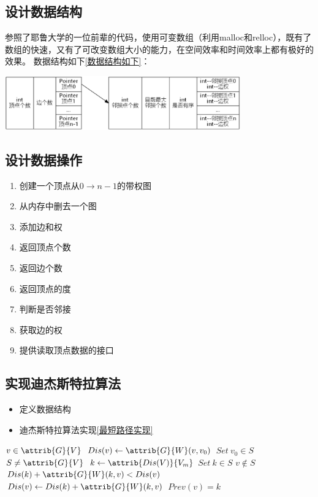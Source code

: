 \documentclass[a4paper,10pt]{ctexart}
\begin{document}
\subsection{设计数据结构}
参照了耶鲁大学的一位前辈的代码，使用可变数组（利用malloc和relloc），既有了数组的快速，又有了可改变数组大小的能力，在空间效率和时间效率上都有极好的效果。
数据结构如下\ref{数据结构如下}：


\includegraphics[width=4in]{DataStruct.eps}

\subsection{设计数据操作}
\begin{enumerate}
  \item 创建一个顶点从$0 \to n-1$的带权图
  \item 从内存中删去一个图
  \item 添加边和权
  \item 返回顶点个数
  \item 返回边个数
  \item 返回顶点的度
  \item 判断是否邻接
  \item 获取边的权
  \item 提供读取顶点数据的接口
\end{enumerate}

\subsection{实现迪杰斯特拉算法}
\begin{itemize}
  \item 定义数据结构
  \item 迪杰斯特拉算法实现\ref{最短路径实现}
\end{itemize}
\begin{codebox}
\li \For $v \in \attrib{G}{V}$                          
    \Do 
\li     $Dis(v) \gets \attrib{G}{W}(v,v_0)$             
    \End
\li $Set \  v_0 \in S$                                         
\li \While $S \ne \attrib{G}{V}$                            
    \Do
\li     $k \gets \attrib{Dis(V)}{V_m}$
\li     $Set \  k \in S$
\li     \For $v \notin S$
        \Do
\li        \If $Dis(k) + \attrib{G}{W}(k,v) < Dis(v)$ 
\li        \Then $Dis(v) \gets Dis(k) + \attrib{G}{W}(k,v)$
\li        $Prev(v) = k $
        \End
    \End
\end{codebox}
\end{document}
